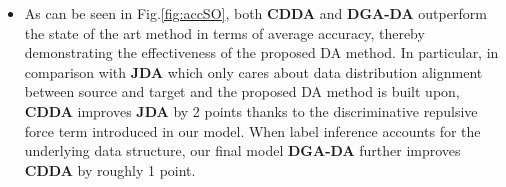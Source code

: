\documentclass[journal,twocolumn]{IEEEtran}
\newcommand\luo[1]{{\footnotesize \color{blue}[#1 - \textbf{Luo}]}}
\begin{document}
\begin{CJK*}{UTF8}{gkai}
\begin{itemize}
\item  As can be seen in Fig.\ref{fig:accSO}, both \textbf{CDDA} and \textbf{DGA-DA} outperform the state of the art method in terms of average accuracy, thereby demonstrating the effectiveness of the proposed DA method. In particular, in comparison with \textbf{JDA} which only cares about data distribution alignment between source and target and the proposed DA method is built upon, \textbf{CDDA} improves \textbf{JDA} by 2 points thanks to the discriminative repulsive force term introduced in our model. When label inference accounts for the underlying data structure, our final model \textbf{DGA-DA} further improves \textbf{CDDA} by roughly 1 point.



\end{itemize}
\end{CJK*}
\end{document}
